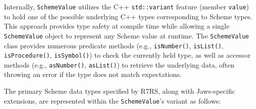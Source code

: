 \documentclass[final]{cmpreport_02}
\begin{document}
Internally, \texttt{SchemeValue} utilizes the C++ \texttt{std::variant} feature (member \texttt{value}) to hold one of the possible underlying C++ types corresponding to Scheme types. This approach provides type safety at compile time while allowing a single \texttt{SchemeValue} object to represent any Scheme value at runtime. The \texttt{SchemeValue} class provides numerous predicate methods (e.g., \texttt{isNumber()}, \texttt{isList()}, \texttt{isProcedure()}, \texttt{isSymbol()}) to check the currently held type, as well as accessor methods (e.g., \texttt{asNumber()}, \texttt{asList()}) to retrieve the underlying data, often throwing an error if the type does not match expectations.

The primary Scheme data types specified by R7RS, along with Jaws-specific extensions, are represented within the \texttt{SchemeValue}'s variant as follows:
\end{document}
